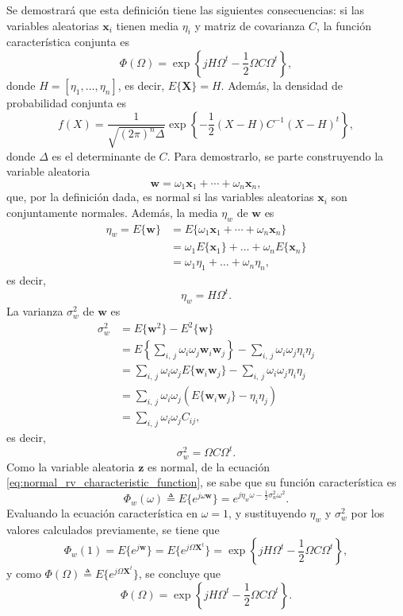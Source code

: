 \documentclass[a4paper]{report}
\newcommand{\X}{\mathbf{X}}
\newcommand{\x}{\mathbf{x}}
\newcommand{\w}{\mathbf{w}}
\newcommand{\z}{\mathbf{z}}
\begin{document}
Se demostrará que esta definición tiene las siguientes consecuencias: si las variables aleatorias \(\x_i\) tienen media \(\eta_i\) y matriz de covarianza \(C\), la función característica conjunta es
\begin{equation}\label{eq:multivariate_normal_characteristic_funcion}
 \Phi(\Omega)=\exp\left\{jH\Omega^t-\frac{1}{2}\Omega C\Omega^t\right\},
\end{equation}
donde \(H=[\eta_1,\dots,\eta_n]\), es decir, \(E\{\X\}=H\).
Además, la densidad de probabilidad conjunta es
\begin{equation}\label{eq:multivariate_normal_density_funcion}
 f(X)=\frac{1}{\sqrt{(2\pi)^n\Delta}}\exp\left\{-\frac{1}{2}(X-H)C^{-1}(X-H)^t\right\},
\end{equation}
donde \(\Delta\) es el determinante de \(C\). Para demostrarlo, se parte construyendo la variable aleatoria
\[
 \w=\omega_1\x_1+\cdots+\omega_n\x_n,
\]
que, por la definición dada, es normal si las variables aleatorias \(\x_i\) son conjuntamente normales. Además, la media \(\eta_w\) de \(\w\) es
\begin{align*}
 \eta_w=E\{\w\}&=E\{\omega_1\x_1+\cdots+\omega_n\x_n\}\\
     &=\omega_1E\{\x_1\}+\dots+\omega_nE\{\x_n\}\\
     &=\omega_1\eta_1+\dots+\omega_n\eta_n,
\end{align*}
es decir,
\[
 \eta_w=H\Omega ^t.
\]
La varianza \(\sigma_w^2\) de \(\w\) es
\begin{align*}
 \sigma_w^2&=E\{\w^2\}-E^2\{\w\}\\
   &=E\left\{\sum_{i,\,j}\omega_i\omega_j\w_i\w_j\right\}-\sum_{i,\,j}\omega_i\omega_j\eta_i\eta_j\\
   &=\sum_{i,\,j}\omega_i\omega_jE\{\w_i\w_j\}-\sum_{i,\,j}\omega_i\omega_j\eta_i\eta_j\\
   &=\sum_{i,\,j}\omega_i\omega_j\left(E\{\w_i\w_j\}-\eta_i\eta_j\right)\\
   &=\sum_{i,\,j}\omega_i\omega_jC_{ij},
\end{align*}
es decir,
\[
 \sigma_w^2=\Omega C\Omega^t.
\]
Como la variable aleatoria \(\z\) es normal, de la ecuación \ref{eq:normal_rv_characteristic_function}, se sabe que su función característica es
\[
 \Phi_w(\omega)\triangleq E\{e^{j\omega\w}\}=e^{j\eta_w\omega-\frac{1}{2}\sigma_w^2\omega^2}.
\]
Evaluando la ecuación característica en \(\omega=1\), y sustituyendo \(\eta_w\) y \(\sigma^2_w\) por los valores calculados previamente, se tiene que
\[
 \Phi_w(1)=E\{e^{j\w}\}=E\{e^{j\Omega\X^t}\}=\exp\left\{jH\Omega ^t-\frac{1}{2}\Omega C\Omega^t\right\},
\]
y como \(\Phi(\Omega)\triangleq E\{e^{j\Omega\X^t}\}\), se concluye que
\[
 \Phi(\Omega)=\exp\left\{jH\Omega ^t-\frac{1}{2}\Omega C\Omega^t\right\}.
\]
\end{document}
